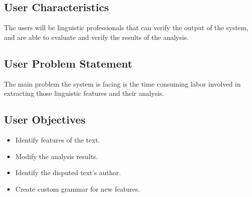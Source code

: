 \subsection{User Characteristics}
The users will be linguistic professionals that can verify the output of the system, and are able to evaluate and verify the results of the analysis.
\subsection{User Problem Statement}
The main problem the system is facing is the time consuming labor involved in extracting those linguistic features and their analysis.
\subsection{User Objectives}
\begin{itemize}
    \item Identify features of the text.
    \item Modify the analysis results.
    \item Identify the disputed text's author.
    \item Create custom grammar for new features.
\end{itemize}


